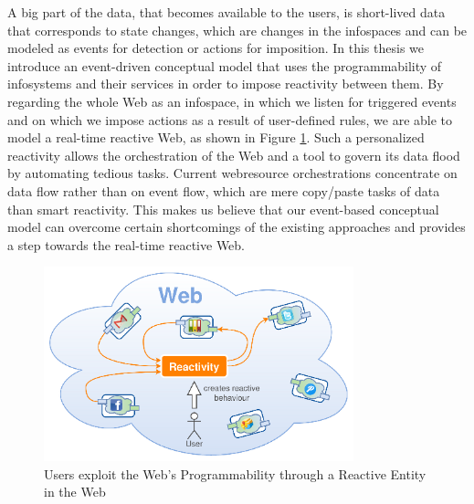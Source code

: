 A big part of the data, that becomes available to the users, is short-lived data that corresponds to state changes, which are changes in the \textrm{\glspl{infospace}} and can be modeled as events for detection or actions for imposition.
In this thesis we introduce an event-driven conceptual model that uses the programmability of \textrm{\glspl{infosystem}} and their services in order to impose reactivity between them.
By regarding the whole Web as an \textrm{\gls{infospace}}, in which we listen for triggered events and on which we impose actions as a result of user-defined rules, we are able to model a real-time reactive Web, as shown in Figure \ref{fig:UsersWeildServicesInTheWeb}.
Such a personalized reactivity allows the orchestration of the Web and a tool to govern its data flood by automating tedious tasks.
Current \textrm{\gls{webresource}} orchestrations concentrate on data flow rather than on event flow, which are mere copy/paste tasks of data than smart reactivity.
This makes us believe that our event-based conceptual model can overcome certain shortcomings of the existing approaches and provides a step towards the real-time reactive Web.


\begin{figure}[!ht]
  \centering
  \includegraphics[width=0.8\textwidth]{figures/ReactivityOnTheWeb}
  \caption{Users exploit the Web's Programmability through a Reactive Entity in the Web}
  \label{fig:UsersWeildServicesInTheWeb}
\end{figure}



